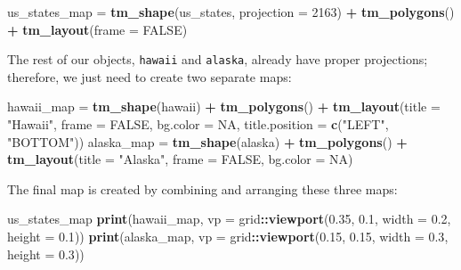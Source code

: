 \documentclass[]{krantz}
\newenvironment{Shaded}{\begin{snugshade}}{\end{snugshade}}
\newcommand{\DataTypeTok}[1]{\textcolor[rgb]{0.27,0.27,0.27}{#1}}
\newcommand{\DecValTok}[1]{\textcolor[rgb]{0.06,0.06,0.06}{#1}}
\newcommand{\FloatTok}[1]{\textcolor[rgb]{0.06,0.06,0.06}{#1}}
\newcommand{\KeywordTok}[1]{\textcolor[rgb]{0.27,0.27,0.27}{\textbf{#1}}}
\newcommand{\NormalTok}[1]{#1}
\newcommand{\OperatorTok}[1]{\textcolor[rgb]{0.43,0.43,0.43}{\textbf{#1}}}
\newcommand{\OtherTok}[1]{\textcolor[rgb]{0.37,0.37,0.37}{#1}}
\newcommand{\StringTok}[1]{\textcolor[rgb]{0.5,0.5,0.5}{#1}}
\begin{document}
\begin{Shaded}
\begin{Highlighting}[]
\NormalTok{us_states_map =}\StringTok{ }\KeywordTok{tm_shape}\NormalTok{(us_states, }\DataTypeTok{projection =} \DecValTok{2163}\NormalTok{) }\OperatorTok{+}\StringTok{ }\KeywordTok{tm_polygons}\NormalTok{() }\OperatorTok{+}\StringTok{ }
\StringTok{  }\KeywordTok{tm_layout}\NormalTok{(}\DataTypeTok{frame =} \OtherTok{FALSE}\NormalTok{)}
\end{Highlighting}
\end{Shaded}

The rest of our objects, \texttt{hawaii} and \texttt{alaska}, already have proper projections; therefore, we just need to create two separate maps:

\begin{Shaded}
\begin{Highlighting}[]
\NormalTok{hawaii_map =}\StringTok{ }\KeywordTok{tm_shape}\NormalTok{(hawaii) }\OperatorTok{+}\StringTok{ }\KeywordTok{tm_polygons}\NormalTok{() }\OperatorTok{+}\StringTok{ }
\StringTok{  }\KeywordTok{tm_layout}\NormalTok{(}\DataTypeTok{title =} \StringTok{"Hawaii"}\NormalTok{, }\DataTypeTok{frame =} \OtherTok{FALSE}\NormalTok{, }\DataTypeTok{bg.color =} \OtherTok{NA}\NormalTok{, }
            \DataTypeTok{title.position =} \KeywordTok{c}\NormalTok{(}\StringTok{"LEFT"}\NormalTok{, }\StringTok{"BOTTOM"}\NormalTok{))}
\NormalTok{alaska_map =}\StringTok{ }\KeywordTok{tm_shape}\NormalTok{(alaska) }\OperatorTok{+}\StringTok{ }\KeywordTok{tm_polygons}\NormalTok{() }\OperatorTok{+}\StringTok{ }
\StringTok{  }\KeywordTok{tm_layout}\NormalTok{(}\DataTypeTok{title =} \StringTok{"Alaska"}\NormalTok{, }\DataTypeTok{frame =} \OtherTok{FALSE}\NormalTok{, }\DataTypeTok{bg.color =} \OtherTok{NA}\NormalTok{)}
\end{Highlighting}
\end{Shaded}

The final map is created by combining and arranging these three maps:

\begin{Shaded}
\begin{Highlighting}[]
\NormalTok{us_states_map}
\KeywordTok{print}\NormalTok{(hawaii_map, }\DataTypeTok{vp =}\NormalTok{ grid}\OperatorTok{::}\KeywordTok{viewport}\NormalTok{(}\FloatTok{0.35}\NormalTok{, }\FloatTok{0.1}\NormalTok{, }\DataTypeTok{width =} \FloatTok{0.2}\NormalTok{, }\DataTypeTok{height =} \FloatTok{0.1}\NormalTok{))}
\KeywordTok{print}\NormalTok{(alaska_map, }\DataTypeTok{vp =}\NormalTok{ grid}\OperatorTok{::}\KeywordTok{viewport}\NormalTok{(}\FloatTok{0.15}\NormalTok{, }\FloatTok{0.15}\NormalTok{, }\DataTypeTok{width =} \FloatTok{0.3}\NormalTok{, }\DataTypeTok{height =} \FloatTok{0.3}\NormalTok{))}
\end{Highlighting}
\end{Shaded}
\end{document}
